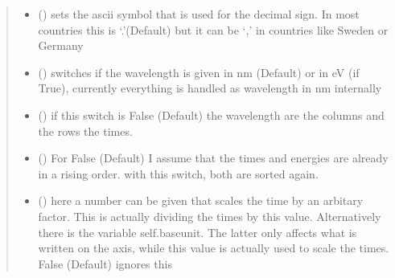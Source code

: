 \documentclass[letterpaper,10pt,english]{sphinxmanual}
\begin{document}
\begin{fulllineitems}
\begin{quote}
\begin{description}
\begin{itemize}
\item {} 
 (\sphinxstyleliteralemphasis{\sphinxupquote{ (}}\sphinxstyleliteralemphasis{\sphinxupquote{)}}) \textendash{} sets the ascii symbol that is used for the decimal sign. In most countries this is ‘.’(Default)
but it can be ‘,’ in countries like Sweden or Germany

\item {} 
 (\sphinxstyleliteralemphasis{\sphinxupquote{ (}}\sphinxstyleliteralemphasis{\sphinxupquote{)}}) \textendash{} switches if the wavelength is given in nm (Default) or in eV (if True), currently everything
is handled as wavelength in nm internally

\item {} 
 (\sphinxstyleliteralemphasis{\sphinxupquote{ (}}\sphinxstyleliteralemphasis{\sphinxupquote{)}}) \textendash{} if this switch is False (Default) the wavelength are the columns and the rows the times.

\item {} 
 (\sphinxstyleliteralemphasis{\sphinxupquote{ (}}\sphinxstyleliteralemphasis{\sphinxupquote{)}}) \textendash{} For False (Default) I assume that the times and energies are already in a rising order.
with this switch, both are sorted again.

\item {} 
 (\sphinxstyleliteralemphasis{\sphinxupquote{ (}}\sphinxstyleliteralemphasis{\sphinxupquote{)}}) \textendash{} here a number can be given that scales the time by an arbitary factor. This is actually dividing
the times by this value. Alternatively there is the variable self.baseunit. The latter only affects
what is written on the axis, while this value is actually used to scale the times. False (Default)
ignores this


\end{itemize}
\end{description}
\end{quote}
\end{fulllineitems}
\end{document}
